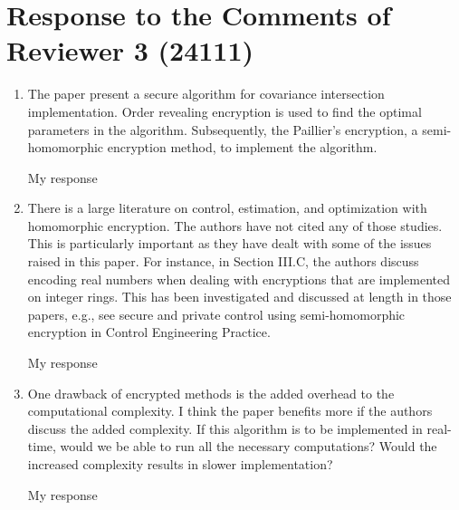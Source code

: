 \documentclass[a4paper]{scrartcl}
\newenvironment{rebuttal}{\begin{enumerate}[label={\color{grey}\thesection.\arabic{enumi}},leftmargin=0pt,ref=\thesection.\arabic{enumi}]}{\end{enumerate}}
\newcommand{\reviewtext}[1]{{\color{nblue} #1}}
\begin{document}



\section*{Response to the Comments of Reviewer 3 (24111)}
\def\thesection{R3}
\begin{rebuttal}
\item \reviewtext{The paper present a secure algorithm for covariance intersection
implementation. Order revealing encryption is used to find the optimal
parameters in the algorithm. Subsequently, the Paillier's encryption, a
semi-homomorphic encryption method, to implement the algorithm. }

My response

\item \reviewtext{There is a large literature on control, estimation, and optimization
with homomorphic encryption. The authors have not cited any of those
studies. This is particularly important as they have dealt with some of
the issues raised in this paper. For instance, in Section III.C, the
authors discuss encoding real numbers when dealing with encryptions
that are implemented on integer rings. This has been investigated and
discussed at length in those papers, e.g., see secure and private
control using semi-homomorphic encryption in Control Engineering
Practice.}

My response

\item \reviewtext{One drawback of encrypted methods is the added overhead to the
computational complexity. I think the paper benefits more if the
authors discuss the added complexity. If this algorithm is to be
implemented in real-time, would we be able to run all the necessary
computations? Would the increased complexity results in slower
implementation?}

My response


\end{rebuttal}


\end{document}
